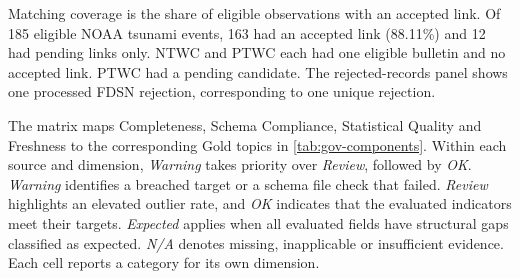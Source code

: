 \documentclass[a4paper,11pt,oneside]{book}
\begin{document}
Matching coverage is the share of eligible observations with an accepted link. Of 185 eligible NOAA tsunami events, 163 had an accepted link (88.11\%) and 12 had pending links only. NTWC and PTWC each had one eligible bulletin and no accepted link. PTWC had a pending candidate. The rejected-records panel shows one processed FDSN rejection, corresponding to one unique rejection.

The matrix maps Completeness, Schema Compliance, Statistical Quality and Freshness to the corresponding Gold topics in \cref{tab:gov-components}. Within each source and dimension, \emph{Warning} takes priority over \emph{Review}, followed by \emph{OK}. \emph{Warning} identifies a breached target or a schema file check that failed. \emph{Review} highlights an elevated outlier rate, and \emph{OK} indicates that the evaluated indicators meet their targets. \emph{Expected} applies when all evaluated fields have structural gaps classified as expected. \emph{N/A} denotes missing, inapplicable or insufficient evidence. Each cell reports a category for its own dimension.
\end{document}
